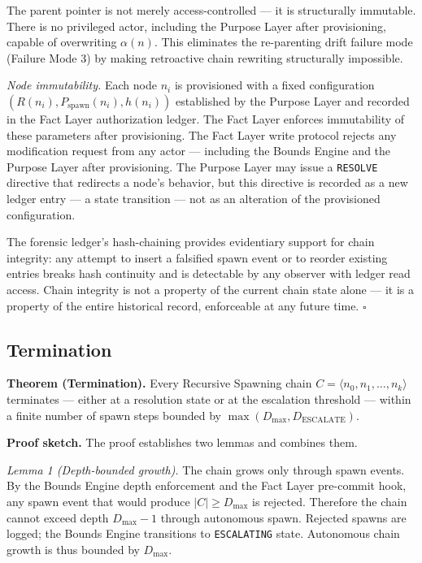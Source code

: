 The parent pointer is not merely access-controlled — it is structurally immutable. There is no privileged actor, including the Purpose Layer after provisioning, capable of overwriting $\alpha(n)$. This eliminates the re-parenting drift failure mode (Failure Mode 3) by making retroactive chain rewriting structurally impossible.

\medskip
\textit{Node immutability.} Each node $n_i$ is provisioned with a fixed configuration $(R(n_i), P_{\mathrm{spawn}}(n_i), h(n_i))$ established by the Purpose Layer and recorded in the Fact Layer authorization ledger. The Fact Layer enforces immutability of these parameters after provisioning. The Fact Layer write protocol rejects any modification request from any actor — including the Bounds Engine and the Purpose Layer after provisioning. The Purpose Layer may issue a \texttt{RESOLVE} directive that redirects a node's behavior, but this directive is recorded as a new ledger entry — a state transition — not as an alteration of the provisioned configuration.

The forensic ledger's hash-chaining provides evidentiary support for chain integrity: any attempt to insert a falsified spawn event or to reorder existing entries breaks hash continuity and is detectable by any observer with ledger read access. Chain integrity is not a property of the current chain state alone — it is a property of the entire historical record, enforceable at any future time. $\square$

\subsection{Termination}
\label{sec:rs-termination}

\medskip
\noindent\textbf{Theorem (Termination).} Every Recursive Spawning chain $C = \langle n_0, n_1, \ldots, n_k \rangle$ terminates — either at a resolution state or at the escalation threshold — within a finite number of spawn steps bounded by $\max(D_{\mathrm{max}}, D_{\mathrm{ESCALATE}})$.

\medskip
\noindent\textbf{Proof sketch.} The proof establishes two lemmas and combines them.

\medskip
\textit{Lemma 1 (Depth-bounded growth).} The chain grows only through spawn events. By the Bounds Engine depth enforcement and the Fact Layer pre-commit hook, any spawn event that would produce $|C| \geq D_{\mathrm{max}}$ is rejected. Therefore the chain cannot exceed depth $D_{\mathrm{max}} - 1$ through autonomous spawn. Rejected spawns are logged; the Bounds Engine transitions to \texttt{ESCALATING} state. Autonomous chain growth is thus bounded by $D_{\mathrm{max}}$.

